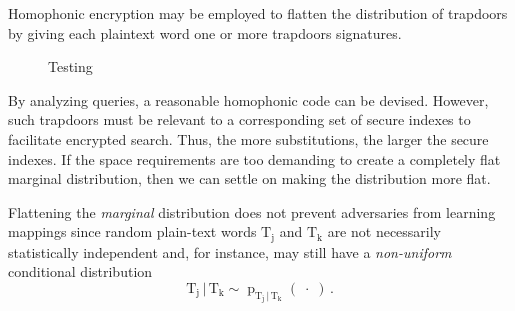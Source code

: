 \documentclass[final,11pt]{article}
\newcommand{\rv}[1]{\mathrm{#1}}
\newcommand{\pmf}{\operatorname{p}}
\newcommand{\given}{{\,|\,}}
\numberwithin{equation}{section}
\theoremstyle{plain}
\theoremstyle{remark}
\begin{document}
Homophonic encryption may be employed to flatten the distribution of trapdoors by giving each plaintext word one or more trapdoors signatures.
\begin{figure}
\caption{Testing}
\end{figure}

By analyzing queries, a reasonable homophonic code can be devised. However, such trapdoors must be relevant to a corresponding set of secure indexes to facilitate encrypted search. Thus, the more substitutions, the larger the secure indexes. If the space requirements are too demanding to create a completely flat marginal distribution, then we can settle on making the distribution more flat.


Flattening the \emph{marginal} distribution does not prevent adversaries from learning mappings since random plain-text words $\rv{T_j}$ and $\rv{T_k}$ are not necessarily statistically independent and, for instance, may still have a \emph{non-uniform} conditional distribution
\begin{equation}
    \rv{T_j} \given \rv{T_k} \sim \pmf_{\rv{T_j} \given \rv{T_k}}\!\left(\;\cdot\;\right)\,.
\end{equation}
\end{document}
